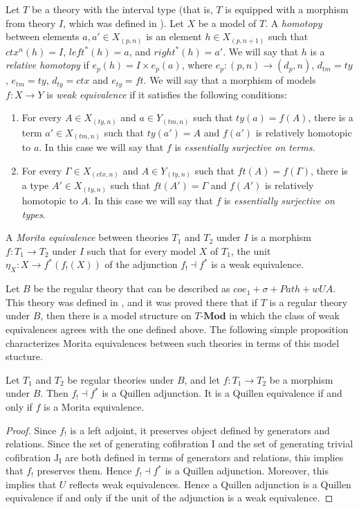 \documentclass[reqno]{amsart}
\theoremstyle{definition}
\theoremstyle{remark}
\newcommand{\cat}[1]{\mathbf{#1}}
\newcommand{\Mod}[1]{#1\text{-}\cat{Mod}}
\newcommand{\I}{\mathrm{I}}
\newcommand{\J}{\mathrm{J}}
\numberwithin{figure}{section}
\begin{document}
Let $T$ be a theory with the interval type (that is, $T$ is equipped with a morphism from theory $I$, which was defined in \cite{alg-models}).
Let $X$ be a model of $T$.
A \emph{homotopy} between elements $a,a' \in X_{(p,n)}$ is an element $h \in X_{(p,n+1)}$ such that $ctx^n(h) = I$, $left^*(h) = a$, and $right^*(h) = a'$.
We will say that $h$ is a \emph{relative homotopy} if $e_p(h) = I \times e_p(a)$, where $e_p : (p,n) \to (d_p,n)$, $d_{tm} = ty$, $e_{tm} = ty$, $d_{ty} = ctx$ and $e_{ty} = ft$.
We will say that a morphism of models $f : X \to Y$ is \emph{weak equivalence} if it satisfies the following conditions:
\begin{enumerate}
\item For every $A \in X_{(ty,n)}$ and $a \in Y_{(tm,n)}$ such that $ty(a) = f(A)$,
there is a term $a' \in X_{(tm,n)}$ such that $ty(a') = A$ and $f(a')$ is relatively homotopic to $a$.
In this case we will say that $f$ is \emph{essentially surjective on terms}.
\item For every $\Gamma \in X_{(ctx,n)}$ and $A \in Y_{(ty,n)}$ such that $ft(A) = f(\Gamma)$,
there is a type $A' \in X_{(ty,n)}$ such that $ft(A') = \Gamma$ and $f(A')$ is relatively homotopic to $A$.
In this case we will say that $f$ is \emph{essentially surjective on types}.
\end{enumerate}

\begin{defn}
A \emph{Morita equivalence} between theories $T_1$ and $T_2$ under $I$ is a morphism $f : T_1 \to T_2$ under $I$ such that for every model $X$ of $T_1$,
the unit $\eta_X : X \to f^*(f_!(X))$ of the adjunction $f_! \dashv f^*$ is a weak equivalence.
\end{defn}

Let $B$ be the regular theory that can be described as $coe_1 + \sigma + Path + wUA$.
This theory was defined in \cite{alg-models}, and it was proved there that if $T$ is a regular theory under $B$,
then there is a model structure on $\Mod{T}$ in which the class of weak equivalences agrees with the one defined above.
The following simple proposition characterizes Morita equivalences between such theories in terms of this model stucture.

\begin{prop}
Let $T_1$ and $T_2$ be regular theories under $B$, and let $f : T_1 \to T_2$ be a morphism under $B$.
Then $f_! \dashv f^*$ is a Quillen adjunction.
It is a Quillen equivalence if and only if $f$ is a Morita equivalence.
\end{prop}
\begin{proof}
Since $f_!$ is a left adjoint, it preserves object defined by generators and relations.
Since the set of generating cofibration $\I$ and the set of generating trivial cofibration $\J_\I$
are both defined in terms of generators and relations, this implies that $f_!$ preserves them.
Hence $f_! \dashv f^*$ is a Quillen adjunction.
Moreover, this implies that $U$ reflects weak equivalences.
Hence a Quillen adjunction is a Quillen equivalence if and only if the unit of the adjunction is a weak equivalence.
\end{proof}
\end{document}
